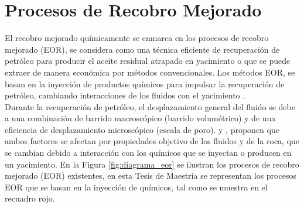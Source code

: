\section{Procesos de Recobro Mejorado}\label{sec:EOR}
El recobro mejorado químicamente se enmarca en los procesos de recobro mejorado (EOR), se considera como una técnica eficiente de recuperación de petróleo para producir el aceite residual atrapado en yacimiento o que se puede extraer de manera económica por métodos convencionales. Los métodos EOR, se basan en la inyección de productos químicos para impulsar la recuperación de petróleo, cambiando interacciones de los fluidos con el yacimiento \citep{gbadamosi2019overview}.\\

Durante la recuperación de petróleo, el desplazamiento general del fluido se debe a una combinación de barrido macroscópico (barrido volumétrico) y de una eficiencia de desplazamiento microscópico (escala de poro). \cite{olajire2014review} y \cite{samanta2012comparative}, proponen que ambos factores se afectan por propiedades objetivo de los fluidos y de la roca, que se cambian debido a interacción con los químicos que se inyectan o producen en un yacimiento. En la Figura \ref{fig:diagrama_eor} se ilustran los procesos de recobro mejorado (EOR) existentes, en esta Tesis de Maestría se representan los procesos EOR que se basan en la inyección de químicos, tal como se muestra en el recuadro rojo.

